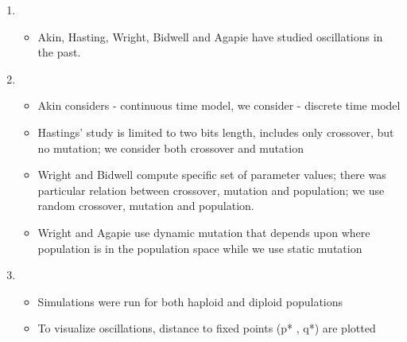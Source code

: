 \documentclass{article}
\begin{document}
\begin{enumerate}
\item
  \begin{itemize}
    \item Akin, Hasting, Wright, Bidwell and Agapie have studied oscillations in the past.
  \end{itemize}

    
\item
  \begin{itemize}
  \item Akin considers - continuous time model, we consider -
    discrete time model
   \item Hastings' study is limited to two bits length, includes only
     crossover, but no mutation; we consider both crossover and mutation
  \item Wright and Bidwell compute specific set of parameter values; there was particular relation between crossover, mutation and population; we use random crossover, mutation and population.
  \item Wright and Agapie use dynamic mutation that depends upon
    where population is in the population space while we use static
    mutation
  \end{itemize}

\item
  \begin{itemize}
  \item Simulations were run for both haploid and diploid populations
  \item To visualize oscillations, distance to fixed points (p* , q*) are plotted
  \end{itemize}
    

\end{enumerate}
\end{document}
